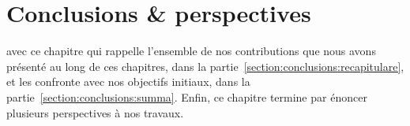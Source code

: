 \chapter{Conclusions \& perspectives}
\label{chapter:conclusions}

\mminitoc

 avec ce
chapitre qui rappelle l'ensemble de nos contributions que nous avons présenté au
long de ces chapitres, dans la partie~\ref{section:conclusions:recapitulare}, et
les confronte avec nos objectifs initiaux, dans la
partie~\ref{section:conclusions:summa}. Enfin, ce chapitre termine par énoncer
plusieurs perspectives à nos travaux.

